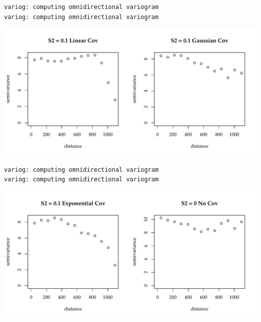 \documentclass{article}\usepackage[]{graphicx}\usepackage[]{color}
\makeatletter
\def\maxwidth{ %
  \ifdim\Gin@nat@width>\linewidth
    \linewidth
  \else
    \Gin@nat@width
  \fi
}
\newenvironment{kframe}{%
 \def\at@end@of@kframe{}%
 \ifinner\ifhmode%
  \def\at@end@of@kframe{\end{minipage}}%
  \begin{minipage}{\columnwidth}%
 \fi\fi%
 \def\FrameCommand##1{\hskip\@totalleftmargin \hskip-\fboxsep
 \colorbox{shadecolor}{##1}\hskip-\fboxsep
     \hskip-\linewidth \hskip-\@totalleftmargin \hskip\columnwidth}%
 \MakeFramed {\advance\hsize-\width
   \@totalleftmargin\z@ \linewidth\hsize
   \@setminipage}}%
 {\par\unskip\endMakeFramed%
 \at@end@of@kframe}
\newenvironment{knitrout}{}{} %
\makeatother
\begin{document}
\begin{knitrout}\footnotesize
{}\color{fgcolor}\begin{kframe}
\begin{verbatim}
variog: computing omnidirectional variogram
variog: computing omnidirectional variogram
\end{verbatim}
\end{kframe}

{\centering \includegraphics[width=\maxwidth]{figure/init_var-1} 

}


\begin{kframe}\begin{verbatim}
variog: computing omnidirectional variogram
variog: computing omnidirectional variogram
\end{verbatim}
\end{kframe}

{\centering \includegraphics[width=\maxwidth]{figure/init_var-2} 

}


\begin{kframe}

{\ttfamily\noindent\bfseries\color{errorcolor}{Error in mvrnorm(mu = rep(0, dim(gaussV)[1]), Sigma = as.matrix(gaussV[, : 'Sigma' is not positive definite}}

{\ttfamily\noindent\bfseries\color{errorcolor}{Error in mvrnorm(mu = rep(0, dim(expV)[1]), Sigma = expV[, , i]): 'Sigma' is not positive definite}}\end{kframe}
\end{knitrout}
\end{document}
